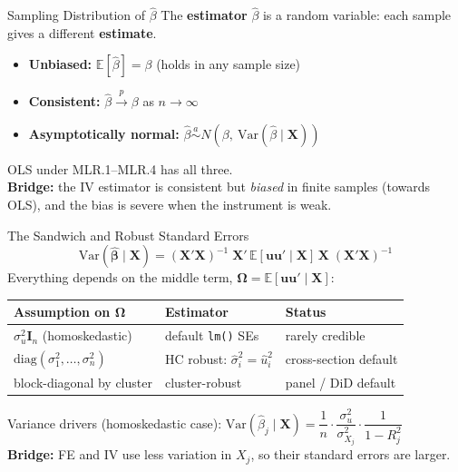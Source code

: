 \documentclass[9pt,aspectratio=169]{beamer}
\newcommand{\E}{\mathbb{E}}
\newcommand{\Var}{\mathrm{Var}}
\begin{document}
\begin{frame}{Sampling Distribution of $\hat\beta$}
\linespread{1.2}\selectfont
  The \textbf{estimator} $\hat\beta$ is a random variable: each sample gives a different \textbf{estimate}.
  \medskip

  \begin{itemize}
    \item \textbf{Unbiased:} $\E[\hat\beta]=\beta$ (holds in any sample size)
    \item \textbf{Consistent:} $\hat\beta\xrightarrow{p}\beta$ as $n\to\infty$
    \item \textbf{Asymptotically normal:} $\hat\beta \overset{a}{\sim} N\!\left(\beta,\ \Var(\hat\beta\mid\bm X)\right)$
  \end{itemize}
  \medskip
  OLS under MLR.1--MLR.4 has all three.\\
  \textbf{Bridge:} the IV estimator is consistent but \emph{biased} in finite samples (towards OLS), and the bias is severe when the instrument is weak.
\end{frame}

\begin{frame}{The Sandwich and Robust Standard Errors}
\linespread{1.2}\selectfont
  \[
    \Var(\hat{\bm\beta}\mid\bm X) = (\bm X'\bm X)^{-1}\;\bm X'\,\E[\bm u\bm u'\mid\bm X]\,\bm X\;(\bm X'\bm X)^{-1}
  \]
  Everything depends on the middle term, $\bm\Omega=\E[\bm u\bm u'\mid\bm X]$:
  \medskip

  \begin{tabular}{@{}lll@{}}
    \toprule
    Assumption on $\bm\Omega$ & Estimator & Status \\
    \midrule
    $\sigma^2_u\bm I_n$ (homoskedastic) & default \texttt{lm()} SEs & rarely credible \\
    $\mathrm{diag}(\sigma^2_1,\dots,\sigma^2_n)$ & HC robust: $\hat\sigma^2_i=\hat u_i^2$ & cross-section default \\
    block-diagonal by cluster & cluster-robust & panel / DiD default \\
    \bottomrule
  \end{tabular}
  \medskip

  Variance drivers (homoskedastic case):
  $\Var(\hat\beta_j\mid\bm X)=\dfrac{1}{n}\cdot\dfrac{\sigma_u^2}{\sigma^2_{X_j}}\cdot\dfrac{1}{1-R_j^2}$\\
  \textbf{Bridge:} FE and IV use less variation in $X_j$, so their standard errors are larger.
\end{frame}
\end{document}
